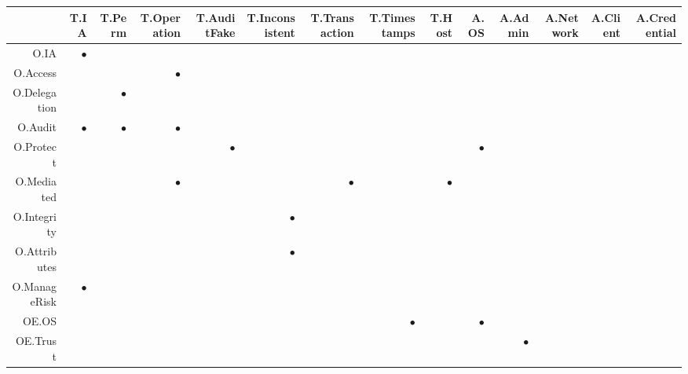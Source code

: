 \documentclass[12pt,english]{scrbook}
\newcommand{\oh}{$\bullet$}
\begin{document}
  \begin{longtable}{r|R|R|R|R|R|R|R|R|R|R|R|R|R|}
    \toprule
              & T.IA  & T.Perm &T.Operation&T.AuditFake& T.Inconsistent&T.Transaction&T.Timestamps & T.Host & A.OS & A.Admin & A.Network & A.Client & A.Credential  \\
    \midrule\endhead
O.IA         &  \oh  &       &            &            &               &             &             &        &      &         &           &          &               \\
O.Access     &       &       & \oh   &            &               &             &             &        &      &         &           &          &               \\
O.Delegation &       &   \oh &            &            &               &             &             &        &      &         &           &          &               \\
O.Audit      & \oh   &   \oh &     \oh    &            &               &             &             &        &      &         &           &          &               \\
O.Protect    &       &       &            &    \oh     &               &             &             &        & \oh  &         &           &          &               \\
O.Mediated &       &       &      \oh   &            &               &    \oh      &             &   \oh  &      &         &           &          &               \\
O.Integrity  &       &       &            &            &  \oh          &             &             &        &      &         &           &          &               \\
O.Attributes &       &       &            &            &  \oh          &             &             &        &      &         &           &          &               \\
O.ManageRisk &   \oh &       &            &            &               &             &             &        &      &         &           &          &               \\
\midrule
OE.OS        &       &       &            &            &               &             &    \oh      &        &  \oh &         &         &            &          \\
OE.Trust     &       &       &            &            &               &             &             &        &      &  \oh    &         &            &            \\

\end{longtable}
\end{document}

